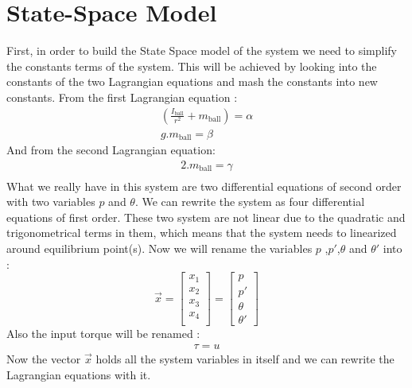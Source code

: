\documentclass{article}
\begin{document}
\section{State-Space Model}
First, in order to build the State Space model of the system we need to simplify the constants terms of the system.
This will be achieved by looking into the constants of the two Lagrangian equations and mash the constants into new constants.
From the first Lagrangian equation :
\begin{equation}
	\begin{split}
		(\frac{I_{\text{ball}}}{r^2}+m_{\text{ball}}) = \alpha \\
		g.m_{\text{ball}} = \beta
	\end{split}
\end{equation}
And from the second Lagrangian equation:
\begin{equation}
	\begin{split}
		2.m_{\text{ball}} = \gamma \\
	\end{split}
\end{equation}
What we really have in this system are two differential equations of second order with two variables $p$ and $\theta$.
We can rewrite the system as four differential equations of first order.
These two system are not linear due to the quadratic and trigonometrical terms in them, which means that the system needs to linearized around equilibrium point(s).
Now we will rename the variables $p$ ,$p'$,$\theta$ and $\theta'$ into :
\begin{equation}
	\vec{x} =
	\begin{bmatrix}
		x_1 \\
		x_2 \\
		x_3 \\
		x_4 \\
	\end{bmatrix}=
	\begin{bmatrix}
		p \\
		p' \\
		\theta \\
		\theta '
	\end{bmatrix}
\end{equation}
Also the input torque will be renamed :
\begin{equation}
	\begin{split}
		\tau = u
	\end{split}
\end{equation}
Now the vector $\vec{x}$ holds all the system variables in itself and we can rewrite the Lagrangian equations with it.
\end{document}
